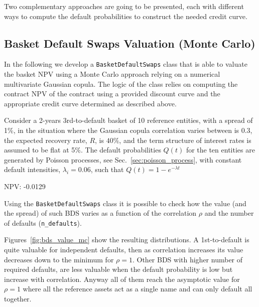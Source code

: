 Two complementary approaches are going to be presented, each with different ways to compute the default probabilities to construct the needed credit curve.

\subsection{Basket Default Swaps Valuation (Monte Carlo)}
\label{basket-cds-valuation-with-monte-carlo}

\begin{finmarkets}
In the following we develop a \texttt{BasketDefaultSwaps} class that is able to valuate the basket NPV using a Monte Carlo approach relying on a numerical multivariate Gaussian copula. 
The logic of the class relies on computing the contract NPV of the contract using a provided discount curve and the appropriate credit curve determined as described above.
\end{finmarkets}


Consider a 2-years 3rd-to-default basket of 10 reference entities, with a spread of 1\%, in the situation where the Gaussian copula correlation varies between is 0.3, the expected recovery rate, $R$, is $40\%$, and the term structure of interest rates is assumed to be flat at 5\%. The default probabilities $Q(t)$ for the ten entities are generated by Poisson processes, see Sec.~\ref{sec:poisson_process}, with constant default intensities, $\lambda_i=0.06$, such that $Q(t) = 1 - e^{-\lambda t}$

\begin{ioutput}
NPV: -0.0129
\end{ioutput}

Using the \texttt{BasketDefaultSwaps} class it is possible to check how the value (and the spread) of such BDS varies as a function of the correlation $\rho$ and the number of defaults (\texttt{n\_defaults}).

Figures~\ref{fig:bds_value_mc} show the resulting distributions. A 1st-to-default is quite valuable for independent defaults, then as correlation increases its value decreases down to the minimum for $\rho=1$.
Other BDS with higher number of required defaults, are less valuable when the default probability is low but increase with correlation. Anyway all of them reach the asymptotic value for $\rho=1$ where all the reference assets act as a single name and can only default all together.

